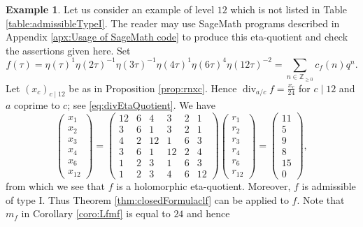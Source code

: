 \documentclass[12pt]{amsart}
\numberwithin{equation}{section}
\theoremstyle{plain}
\theoremstyle{definition}
\newtheorem{examp}[thm]{Example}
\theoremstyle{remark}
\renewcommand\div{\mathop{\mathrm{div}}}
\newcommand\numgeq[2]{\mathbb{#1}_{\geq #2}}
\begin{document}
\begin{examp}
\label{examp:level12}
Let us consider an example of level $12$ which is not listed in Table \ref{table:admissibleTypeI}. The reader may use SageMath programs described in Appendix \ref{apx:Usage of SageMath code} to produce this eta-quotient and check the assertions given here. Set
\begin{equation*}
f(\tau)=\eta(\tau)^{1}\eta(2\tau)^{-1}\eta(3\tau)^{-1}\eta(4\tau)^{1}\eta(6\tau)^4\eta(12\tau)^{-2}=\sum_{n\in\numgeq{Z}{0}}c_f(n)q^n.
\end{equation*}
Let $(x_c)_{c\mid 12}$ be as in Proposition \ref{prop:rnxc}. Hence $\div_{a/c}f=\frac{x_c}{24}$ for $c\mid 12$ and $a$ coprime to $c$; see \eqref{eq:divEtaQuotient}. We have
\begin{equation*}
\begin{pmatrix}
x_1 \\ x_2 \\ x_3 \\ x_4 \\ x_6 \\ x_{12}
\end{pmatrix}=
\begin{pmatrix}
12 & 6 & 4 & 3 & 2 & 1 \\
3  & 6 & 1 & 3 & 2 & 1 \\
4 & 2 & 12 & 1 & 6 & 3 \\
3 & 6 & 1 & 12 & 2 & 4 \\
1 & 2 & 3 & 1  & 6 & 3 \\
1 & 2 & 3 & 4  & 6 & 12
\end{pmatrix}
\begin{pmatrix}
r_1 \\ r_2 \\ r_3 \\ r_4 \\ r_6 \\ r_{12}
\end{pmatrix}=
\begin{pmatrix}
11 \\ 5 \\ 9 \\ 8 \\ 15 \\ 0
\end{pmatrix},
\end{equation*}
from which we see that $f$ is a holomorphic eta-quotient. Moreover, $f$ is admissible of type I. Thus Theorem \ref{thm:closedFormulaclf} can be applied to $f$. Note that $m_f$ in Corollary \ref{coro:Lfmf} is equal to $24$ and hence

\end{examp}
\end{document}
